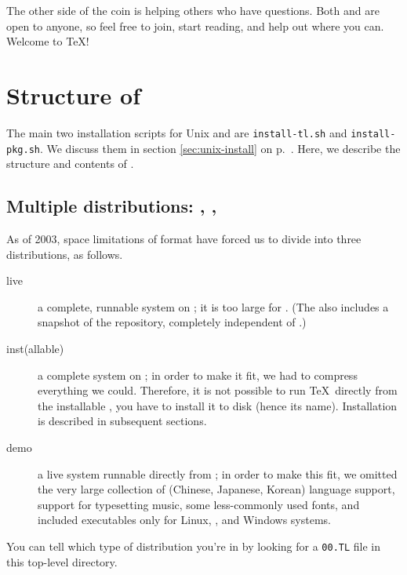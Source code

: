\documentclass{article}
\begin{document}
The other side of the coin is helping others who have questions.  Both
 and  are open to anyone, so feel
free to join, start reading, and help out where you can.  Welcome to
\TeX{}!


\section{Structure of \protect\TeXLive}
\label{sec:struct-tl}

The main two installation scripts for Unix and \MacOSX{} are
\texttt{install-tl.sh} and \texttt{install-pkg.sh}.  We discuss them
in section \ref{sec:unix-install} on p.~\pageref{sec:unix-install}.
Here, we describe the structure and contents of \TeXLive{}.


\subsection{Multiple distributions: \protect{},
            \protect{}, \protect{}}
\label{sec:multiple-dist}

As of 2003, space limitations of  format have forced us to
divide \TeXLive{} into three distributions, as follows.

\begin{description}

\item [live] a complete, runnable system on ; it is too large
for .  (The \DVD{} also includes a snapshot of the \CTAN{}
repository, completely independent of \TeXLive{}.)

\item [inst(allable)] a complete system on \CD; in order to make it fit,
we had to compress everything we could.  Therefore, it is not possible
to run \TeX\ directly from the installable \CD, you have to install it to
disk (hence its name).  Installation is described in subsequent sections.
   
\item [demo] a live system runnable directly from \CD; in order to make
this fit, we omitted the very large collection of  (Chinese,
Japanese, Korean) language support, support for typesetting music, some
less-commonly used fonts, and included executables only for Linux,
\MacOSX, and Windows systems.

\end{description}

\noindent You can tell which type of distribution you're in by looking
for a \texttt{00.TL} file in this top-level directory.
\end{document}
